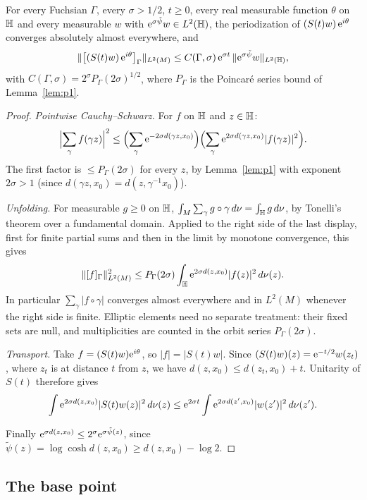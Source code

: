 \begin{lemma}\label{lem:t2}
For every Fuchsian $\Gamma$, every $\sigma>1/2$, $t\ge0$, every real measurable function $\theta$ on $\mathbb{H}$ and every measurable $w$
with $\mathrm{e}^{\sigma\tilde\psi}w\in L^2(\mathbb{H})$, the periodization of $(S(t)w)\,\mathrm{e}^{i\theta}$ converges absolutely almost everywhere, and
\[
\lVert \bigl[(S(t)w)\,\mathrm{e}^{i\theta}\bigr]_\Gamma\rVert_{L^2(M)}\le C(\Gamma,\sigma)\,\mathrm{e}^{\sigma t}\,\lVert \mathrm{e}^{\sigma\tilde\psi}w\rVert_{L^2(\mathbb{H})},
\]
with $C(\Gamma,\sigma)=2^\sigma P_\Gamma(2\sigma)^{1/2}$, where $P_\Gamma$ is the Poincar\'e series bound of Lemma~\ref{lem:p1}.
\end{lemma}

\begin{proof}
\emph{Pointwise Cauchy--Schwarz.} For $f$ on $\mathbb{H}$ and $z\in\mathbb{H}$:
\[
\Bigl|\sum_\gamma f(\gamma z)\Bigr|^2\le\Bigl(\sum_\gamma\mathrm{e}^{-2\sigma d(\gamma z,x_0)}\Bigr)\Bigl(\sum_\gamma\mathrm{e}^{2\sigma d(\gamma z,x_0)}|f(\gamma z)|^2\Bigr).
\]
The first factor is $\le P_\Gamma(2\sigma)$ for every $z$, by Lemma~\ref{lem:p1} with exponent $2\sigma>1$ (since $d(\gamma z,x_0)=d(z,\gamma^{-1}x_0)$).

\emph{Unfolding.} For measurable $g\ge0$ on $\mathbb{H}$, $\int_M\sum_\gamma g\circ\gamma\,d\nu=\int_{\mathbb{H}} g\,d\nu$, by Tonelli's theorem over
a fundamental domain. Applied to the right side of the last display, first for finite partial sums and then in the limit by monotone
convergence, this gives
\[
\lVert [f]_\Gamma\rVert^2_{L^2(M)}\le P_\Gamma(2\sigma)\int_{\mathbb{H}}\mathrm{e}^{2\sigma d(z,x_0)}|f(z)|^2\,d\nu(z).
\]
In particular $\sum_\gamma|f\circ\gamma|$ converges almost everywhere and in $L^2(M)$ whenever the right side is finite. Elliptic elements need no separate treatment: their fixed sets are null, and multiplicities are counted in the orbit series $P_\Gamma(2\sigma)$.

\emph{Transport.} Take $f=(S(t)w)\mathrm{e}^{i\theta}$, so $|f|=|S(t)w|$.
Since $(S(t)w)(z)=\mathrm{e}^{-t/2}w(z_t)$, where $z_t$ is at distance $t$ from $z$, we have
$d(z,x_0)\le d(z_t,x_0)+t$. Unitarity of $S(t)$ therefore gives
\[
  \int\mathrm{e}^{2\sigma d(z,x_0)}|S(t)w(z)|^2\,d\nu(z)
  \le\mathrm{e}^{2\sigma t}\int\mathrm{e}^{2\sigma d(z',x_0)}|w(z')|^2\,d\nu(z').
\]

Finally $\mathrm{e}^{\sigma d(z,x_0)}\le2^\sigma\mathrm{e}^{\sigma\tilde\psi(z)}$, since $\tilde\psi(z)=\log\cosh d(z,x_0)\ge d(z,x_0)-\log2$. \qedhere
\end{proof}



\subsection{The base point}\label{subsec:dd-base}


